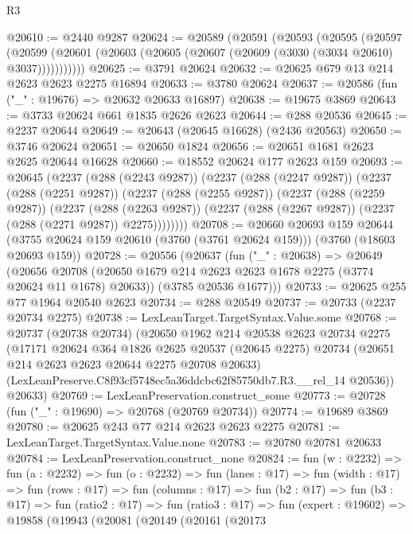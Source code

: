 \begin{lexlean}{R3}
\begin{coremodule}
@20610 := @2440 @9287
@20624 := @20589
    (@20591
      (@20593
        (@20595
          (@20597
            (@20599 (@20601 (@20603 (@20605 (@20607 (@20609 (@3030 (@3034 @20610) @3037)))))))))))
@20625 := @3791 @20624
@20632 := @20625 @679 @13 @214 @2623 @2623 @2275 @16894
@20633 := @3780 @20624
@20637 := @20586 (fun ("_" : @19676) => @20632 @20633 @16897)
@20638 := @19675 @3869
@20643 := @3733 @20624 @661 @1835 @2626 @2623
@20644 := @288 @20536
@20645 := @2237 @20644
@20649 := @20643 (@20645 @16628) (@2436 @20563)
@20650 := @3746 @20624
@20651 := @20650 @1824
@20656 := @20651 @1681 @2623 @2625 @20644 @16628
@20660 := @18552 @20624 @177 @2623 @159
@20693 := @20645
    (@2237
      (@288 (@2243 @9287))
      (@2237
        (@288 (@2247 @9287))
        (@2237
          (@288 (@2251 @9287))
          (@2237
            (@288 (@2255 @9287))
            (@2237
              (@288 (@2259 @9287))
              (@2237
                (@288 (@2263 @9287))
                (@2237 (@288 (@2267 @9287)) (@2237 (@288 (@2271 @9287)) @2275))))))))
@20708 := @20660
    @20693
    @159
    @20644
    (@3755 @20624 @159 @20610 (@3760 (@3761 @20624 @159)))
    (@3760 (@18603 @20693 @159))
@20728 := @20556
    (@20637
      (fun ("_" : @20638) =>
      @20649
        (@20656 @20708 (@20650 @1679 @214 @2623 @2623 @1678 @2275 (@3774 @20624 @11 @1678) @20633))
        (@3785 @20536 @1677)))
@20733 := @20625 @255 @77 @1964 @20540 @2623
@20734 := @288 @20549
@20737 := @20733 (@2237 @20734 @2275)
@20738 := LexLeanTarget.TargetSyntax.Value.some
@20768 := @20737
    (@20738 @20734)
    (@20650
      @1962
      @214
      @20538
      @2623
      @20734
      @2275
      (@17171
        @20624
        @364
        @1826
        @2625
        @20537
        (@20645 @2275)
        @20734
        (@20651 @214 @2623 @2623 @20644 @2275 @20708 @20633)
        (LexLeanPreserve.C8f93cf5748ec5a36ddcbc62f85750db7.R3.__rel_14 @20536))
      @20633)
@20769 := LexLeanPreservation.construct_some
@20773 := @20728 (fun ("_" : @19690) => @20768 (@20769 @20734))
@20774 := @19689 @3869
@20780 := @20625 @243 @77 @214 @2623 @2623 @2275
@20781 := LexLeanTarget.TargetSyntax.Value.none
@20783 := @20780 @20781 @20633
@20784 := LexLeanPreservation.construct_none
@20824 := fun (w : @2232) =>
  fun (a : @2232) =>
  fun (o : @2232) =>
  fun (lanes : @17) =>
  fun (width : @17) =>
  fun (rows : @17) =>
  fun (columns : @17) =>
  fun (b2 : @17) =>
  fun (b3 : @17) =>
  fun (ratio2 : @17) =>
  fun (ratio3 : @17) =>
  fun (expert : @19602) =>
  @19858
    (@19943
      (@20081
        (@20149
          (@20161
            (@20173

\end{coremodule}
\end{lexlean}
